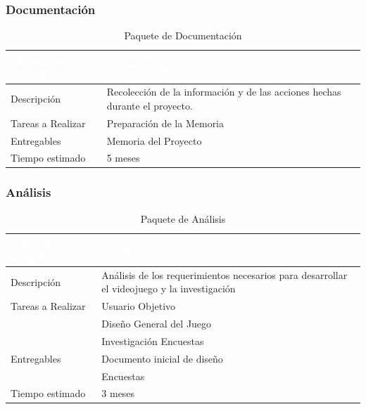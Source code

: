 \subsubsection{Documentación}
\begin{table}[h!]
    \centering
    \begin{tabular}{|l|p{10cm}|}
        \hline
        \rowcolor{Green}
        \textcolor{white}{\textbf{Nombre del Paquete}} & \textcolor{white}{\textbf{Documentación}}\\
        \hline
        \rowcolor{Light Green}
        Descripción & Recolección de la información y de las acciones hechas durante el proyecto.\\
        \hline
        \rowcolor{Light Green}
        Tareas a Realizar & Preparación de la Memoria\\
        \hline
        \rowcolor{Light Green}
        Entregables & Memoria del Proyecto\\
        \hline
        \rowcolor{Light Green}
        Tiempo estimado & 5 meses\\
        \hline
    \end{tabular}
    \caption{Paquete de Documentación}
    \label{tab:paquete-documentacion}
\end{table}

\newpage
\subsubsection{Análisis}
\begin{table}[h!]
    \centering
    \begin{tabular}{|l|p{10cm}|}
        \hline
        \rowcolor{Violet}
        \textcolor{white}{\textbf{Nombre del Paquete}} & \textcolor{white}{\textbf{Análisis}}\\
        \hline
        \rowcolor{Light Violet}
        Descripción & Análisis de los requerimientos necesarios para desarrollar el videojuego y la investigación\\
        \hline
        \rowcolor{Light Violet}
        Tareas a Realizar & Usuario Objetivo\\
        \rowcolor{Light Violet}
        & Diseño General del Juego\\
        \rowcolor{Light Violet}
        & Investigación Encuestas\\
        \hline
        \rowcolor{Light Violet}
        Entregables & Documento inicial de diseño\\
        \rowcolor{Light Violet}
        & Encuestas\\
        \hline
        \rowcolor{Light Violet}
        Tiempo estimado & 3 meses\\
        \hline
    \end{tabular}
    \caption{Paquete de Análisis}
    \label{tab:paquete-analisis}
\end{table}

